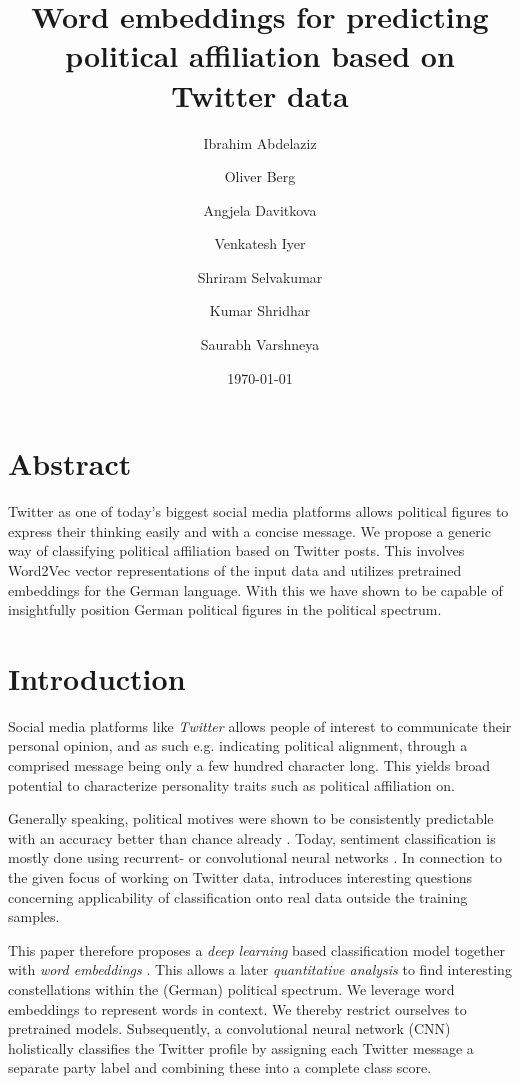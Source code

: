 \documentclass[10pt, oneside]{article}
\title{Word embeddings for predicting political affiliation based on Twitter data}
\author[]{Ibrahim Abdelaziz}
\author[]{Oliver Berg}
\author[]{Angjela Davitkova}
\author[]{Venkatesh Iyer}
\author[]{Shriram Selvakumar}
\author[]{Kumar Shridhar}
\author[]{Saurabh Varshneya}
\affil[1]{Technische Universität Kaiserslautern}
\date{\today}
\begin{document}
\maketitle
\begin{multicols}{2}


\section{Abstract}

Twitter as one of today's biggest social media platforms allows political figures to express their thinking easily and with a concise message. We propose a generic way of classifying political affiliation based on Twitter posts. This involves Word2Vec vector representations of the input data and utilizes pretrained embeddings for the German language. With this we have shown to be capable of insightfully position German political figures in the political spectrum. 


\section{Introduction}

Social media platforms like \emph{Twitter} allows people of interest to communicate their personal opinion, and as such e.g. indicating political alignment, through a comprised message being only a few hundred character long. This yields broad potential to characterize personality traits such as political affiliation on.

Generally speaking, political motives were shown to be consistently predictable with an accuracy better than chance already \cite{Biessmann2017}. Today, sentiment classification is mostly done using recurrent- or convolutional neural networks \cite{Kim2014}. In connection to the given focus of working on Twitter data, \cite{Cohen2013} introduces interesting questions concerning applicability of classification onto real data outside the training samples.

This paper therefore proposes a \emph{deep learning} based classification model together with \emph{word embeddings} \cite{Pelevinala2016}. This allows a later \emph{quantitative analysis} to find interesting constellations within the (German) political spectrum.
We leverage word embeddings to represent words in context. We thereby restrict ourselves to pretrained models. Subsequently, a convolutional neural network (CNN) holistically classifies the Twitter profile by assigning each Twitter message a separate party label and combining these into a complete class score.  



\end{multicols}
\end{document}
